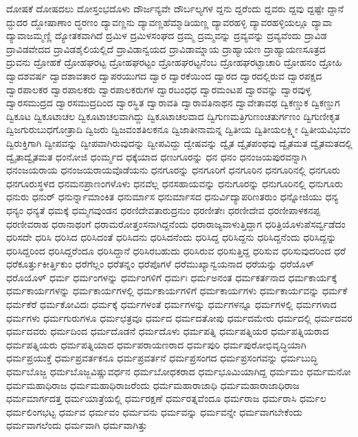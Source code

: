 {ದೋಷಕೆ
ದೋಷದಲು
ದೋಸ್ತಂಭದೊಳು
ದೌರ್ಜನ್ಯವೇ
ದೌರ್ಬಲ್ಯಗಳ
ದ್ದನು
ದ್ದರೆಂದು
ದ್ದವರು
ದ್ದವು
ದ್ದಷ್ಟೇ
ದ್ದಾನೆ
ದ್ದುದರ
ದ್ದೋಷಾಣಾಂ
ದ್ಧರಣಂ
ದ್ಯಾವಣ್ಣನು
ದ್ಯಾವಣ್ಣಹೆಮ್ಮಾಡಿಯಣ್ಣ
ದ್ಯಾವರಹಳ್ಳಿ
ದ್ಯಾವರಹಳ್ಳಿಯಲ್ಲೂ
ದ್ಯಾವಾ
ದ್ಯಾವಾಜಮ್ಮಣ್ಣಿ
ದ್ಯೋತಕವಾಗಿದೆ
ದ್ರಮಿಳ
ದ್ರಮಿಳಸಂಘದ
ದ್ರಮ್ಮ
ದ್ರಮ್ಮವನ್ನು
ದ್ರವ್ಯವನ್ನು
ದ್ರವ್ಯವೆಂದು
ದ್ರಾವಿಡ
ದ್ರಾವಿಡವೇದದ
ದ್ರಾವಿಡಶೈಲಿಯಲ್ಲಿದೆ
ದ್ರಾವಿಡಾನ್ವಯದ
ದ್ರಾವಿಡಾಮ್ನಾಯ
ದ್ರಾಹ್ಯಾಯಣ
ದ್ರಾಹ್ಯಾಯಣಸೂತ್ರದ
ದ್ರುವನು
ದ್ರೋಹಕೆ
ದ್ರೋಹಘರಟ್ಟ
ದ್ರೋಹಘರಟ್ಟಂ
ದ್ರೋಹಘರಟ್ಟನೆಂಬ
ದ್ರೋಹಘರಟ್ಟಾಚಾರಿ
ದ್ರೋಹನಂ
ದ್ರೋಹಿ
ದ್ವಾದಶವರ್ಷ
ದ್ವಾದಶಾವತಾರ
ದ್ವಾಪರಯುಗದ
ದ್ವಾರ
ದ್ವಾರಕೆಯಿಂದ
ದ್ವಾರದ
ದ್ವಾರದಲ್ಲಿರುವ
ದ್ವಾರಪಕ್ಷದ
ದ್ವಾರಪಾಲಕರ
ದ್ವಾರಪಾಲಕರು
ದ್ವಾರಪಾಲಕರುಗಳ
ದ್ವಾರಬಂಧಧ
ದ್ವಾರಮಂಟಪ
ದ್ವಾರವನ್ನು
ದ್ವಾರವುಳ್ಳ
ದ್ವಾರಸಮುದ್ರದ
ದ್ವಾರಸಮುದ್ರದಿಂದ
ದ್ವಾರಸ್ಥಿತ
ದ್ವಾರಾವತಿ
ದ್ವಾರಾವತಿನಾಥನ
ದ್ವಾವೇತಾವಥ
ದ್ವಿಕಣ್ಡುಕ
ದ್ವಿಕಣ್ಡುಗ
ದ್ವಿಕೂಟ
ದ್ವಿಕೂಟಾಚಲ
ದ್ವಿಕೂಟಾಚಲವಾಗಿದ್ದು
ದ್ವಿಕೂಟಾಚಲವಾದ
ದ್ವಿಗುಣಮತ್ರಿಗುಣಂಚತುರ್ಗಣಂ
ದ್ವಿಗುಣೀಕೃತ
ದ್ವಿಜಗುರುಬುಧಗೋತ್ರಾದಿ
ದ್ವಿಜರು
ದ್ವಿಜವಂಶತಿಲಕನೂ
ದ್ವಿಜಾತೀನಾಮನ್ನ
ದ್ವಿತೀಯ
ದ್ವಿತೀಯಲಕ್ಷ್ಮೀ
ದ್ವಿತೀಯವಿಭವಂ
ದ್ವಿರುಕ್ತಿಗಾಗಿ
ದ್ವೀಪವನ್ನು
ದ್ವೀಪವಾಗಿರುವುದನ್ನು
ದ್ವೀಪವಿದ್ದು
ದ್ವೇಷವನ್ನು
ದ್ವೈತ
ದ್ವೈತಪಂಥವು
ದ್ವೈತಮತ
ದ್ವೈತಮತದಲ್ಲಿ
ದ್ವೈತಾದ್ವೈತಮತ
ಧಂನೋಜಿ
ಧಂರ್ಮ್ಮದ
ಧಕ್ಕೆಯಾದ
ಧಣುಗೂರನ್ನು
ಧನ
ಧನಂ
ಧನಂಜಯಪುರವನ್ನಾಗಿ
ಧನಂಜಯರಾಯ
ಧನಂಜಯರಾಯವೊಡೆಯನು
ಧನಗೂರನ್ನು
ಧನಗೂರಿಗೆ
ಧನಗೂರಿನ
ಧನಗೂರಿನಲ್ಲಿ
ಧನಗೂರು
ಧನಗೂರುಸ್ಥಳದ
ಧನಮನಪ್ರಾಣಂಗಳೊಳು
ಧನವೆಲ್ಲ
ಧನಸಹಾಯವನ್ನು
ಧನುಗೂರನ್ನು
ಧನುಗೂರಿನಲ್ಲಿ
ಧನುಗೂರು
ಧನುರು
ಧನುರ್
ಧನುರ್ನ್ನಾಮಾಂಕಿತ
ಧನುರ್ಮಾಸ
ಧನುರ್ಮಾಸದ
ಧನುರ್ವಿದ್ಯಾಪರಿಣತರುಂ
ಧನ್ನೋಜಿಯು
ಧನ್ಯ
ಧನ್ಯಂ
ಧನ್ಯತೆ
ಧಮಕ್ಕೆ
ಧಮ್ಮಗವುಂಡನ
ಧರಣಿದೇವತಾರುದ್ರನುಂ
ಧರಣೀತೇಃ
ಧರಣೀದೇವ
ಧರಣೀಪಾಳಕನಪ್ಪ
ಧರಣೀವರಾಹ
ಧರಾನಾಥಂಗೆ
ಧರಾಮರೋತ್ತಂಸನಾಗಿದ್ದನೆಂದು
ಧರಾರಾಜ್ಯವಾಳುತ್ತಿದ್ದಾಗ
ಧರಿತ್ರಿಯೊಳುಪೆಸರ್ವ್ವಡೆದಂ
ಧರಿಸದೇ
ಧರಿಸಿ
ಧರಿಸಿದ
ಧರಿಸಿದಂತೆ
ಧರಿಸಿದನು
ಧರಿಸಿದನೆಂದು
ಧರಿಸಿದ್ದ
ಧರಿಸಿದ್ದನು
ಧರಿಸಿದ್ದನೆಂದು
ಧರಿಸಿದ್ದನ್ನು
ಧರಿಸಿದ್ದರಿಂದ
ಧರಿಸಿದ್ದರೆಂದೂ
ಧರಿಸಿದ್ದಾನೆ
ಧರಿಸಿರಬಹುದು
ಧರಿಸಿರುವ
ಧರಿಸುತ್ತಿದ್ದ
ಧರಿಸುವ
ಧರಿಸುವುದರಿಂದ
ಧರೆ
ಧರೆಕೂರ್ತ್ತುಕೀರ್ತ್ತಿಕುಂ
ಧರೆಗೆಲ್ಲಂ
ಧರೆತನ್ನಂ
ಧರೆಪೊಗಳೆ
ಧರೆಮುಖ್ಯಾನ್ವಯನಾದ
ಧರೆಯನ್ನು
ಧರೆಯೊಳ್
ಧರೊಯೊಳ್
ಧರ್ಮ
ಧರ್ಮಂಗಳನ್ನು
ಧರ್ಮಂಗಳಿಗೆ
ಧರ್ಮಃ
ಧರ್ಮಅನಂತ
ಧರ್ಮಕರ್ತನಾದ
ಧರ್ಮಕಾರ್ಯಕ್ಕೆ
ಧರ್ಮಕಾರ್ಯಗಳನ್ನು
ಧರ್ಮಕಾರ್ಯಗಳಲ್ಲಿ
ಧರ್ಮಕಾರ್ಯಗಳಿಗೆ
ಧರ್ಮಕಾರ್ಯಗಳು
ಧರ್ಮಕಾರ್ಯವನ್ನು
ಧರ್ಮಕೆ
ಧರ್ಮಕೆರೆ
ಧರ್ಮಕೋವಿದಃ
ಧರ್ಮಕ್ಕೆ
ಧರ್ಮಗಳಂತೆ
ಧರ್ಮಗಳನ್ನು
ಧರ್ಮಗಳನ್ನೂ
ಧರ್ಮಗಳಲ್ಲಿ
ಧರ್ಮಗಳಾದ
ಧರ್ಮಗಳು
ಧರ್ಮಗುರುಗಳೂ
ಧರ್ಮಛತ್ರವೂ
ಧರ್ಮದ
ಧರ್ಮದತೋಪು
ಧರ್ಮದಮೇರು
ಧರ್ಮದಲ್ಲಿ
ಧರ್ಮದವರ
ಧರ್ಮದವರು
ಧರ್ಮದಿಂದ
ಧರ್ಮದೊಡನೆ
ಧರ್ಮದೊಳು
ಧರ್ಮಪತ್ನಿ
ಧರ್ಮಪತ್ನಿಯರ
ಧರ್ಮಪತ್ನಿಯರಾದ
ಧರ್ಮಪತ್ನಿಯರು
ಧರ್ಮಪತ್ನಿಯಾದ
ಧರ್ಮಪರಾಯಣರಾದ
ಧರ್ಮಪುರಿ
ಧರ್ಮಪುರೋಭಿವೃದ್ಧಿಯಾಗಿ
ಧರ್ಮಪ್ರಯುಕ್ತೆ
ಧರ್ಮಪ್ರವರ್ತಕನೂ
ಧರ್ಮಪ್ರವರ್ತನೆ
ಧರ್ಮಪ್ರಸಂಗದ
ಧರ್ಮಪ್ರಸಂಗವನ್ನು
ಧರ್ಮಬುದ್ಧಿ
ಧರ್ಮಬೊಜ್ಜ
ಧರ್ಮಬೊಜ್ಜವಿಷ್ಣುವರ್ಧನ
ಧರ್ಮಬೋಧಕರಾದ
ಧರ್ಮಭೂಮಿಯಾಗಿದ್ದ
ಧರ್ಮಮಂ
ಧರ್ಮಮನೋ
ಧರ್ಮಮಹಾಧಿರಾಜ
ಧರ್ಮಮಹಾಧಿರಾಜರೆಂದು
ಧರ್ಮಮಹಾರಾಜಾಧಿ
ಧರ್ಮಮಹಾರಾಜಾಧಿರಾಜ
ಧರ್ಮಮಾರ್ಗದತ್ತ
ಧರ್ಮಯಾತ್ರೆಯಲ್ಲಿ
ಧರ್ಮರಕ್ಷಣೆ
ಧರ್ಮರತ್ನವೆಂದೂ
ಧರ್ಮರಾಜ
ಧರ್ಮರಾಸಿ
ಧರ್ಮಲ
ಧರ್ಮಲಿಂಗಭಟ್ಟ
ಧರ್ಮವ
ಧರ್ಮವಂ
ಧರ್ಮವನು
ಧರ್ಮವನ್ನು
ಧರ್ಮವನ್ನೇ
ಧರ್ಮವಾಗಬೇಕೆಂದು
ಧರ್ಮವಾಗಲೆಂದು
ಧರ್ಮವಾಗಿ
ಧರ್ಮವಾಗಿತ್ತು
}
